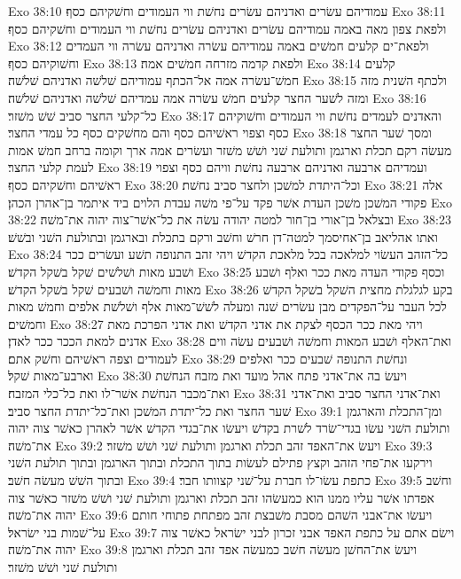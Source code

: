 Exo 38:10  עמודיהם עשׂרים ואדניהם עשׂרים נחשׁת ווי העמודים וחשׁקיהם כסף׃
Exo 38:11  ולפאת צפון מאה באמה עמודיהם עשׂרים ואדניהם עשׂרים נחשׁת ווי העמודים וחשׁקיהם כסף׃
Exo 38:12  ולפאת־ים קלעים חמשׁים באמה עמודיהם עשׂרה ואדניהם עשׂרה ווי העמדים וחשׁוקיהם כסף׃
Exo 38:13  ולפאת קדמה מזרחה חמשׁים אמה׃
Exo 38:14  קלעים חמשׁ־עשׂרה אמה אל־הכתף עמודיהם שׁלשׁה ואדניהם שׁלשׁה׃
Exo 38:15  ולכתף השׁנית מזה ומזה לשׁער החצר קלעים חמשׁ עשׂרה אמה עמדיהם שׁלשׁה ואדניהם שׁלשׁה׃
Exo 38:16  כל־קלעי החצר סביב שׁשׁ משׁזר׃
Exo 38:17  והאדנים לעמדים נחשׁת ווי העמודים וחשׁוקיהם כסף וצפוי ראשׁיהם כסף והם מחשׁקים כסף כל עמדי החצר׃
Exo 38:18  ומסך שׁער החצר מעשׂה רקם תכלת וארגמן ותולעת שׁני ושׁשׁ משׁזר ועשׂרים אמה ארך וקומה ברחב חמשׁ אמות לעמת קלעי החצר׃
Exo 38:19  ועמדיהם ארבעה ואדניהם ארבעה נחשׁת וויהם כסף וצפוי ראשׁיהם וחשׁקיהם כסף׃
Exo 38:20  וכל־היתדת למשׁכן ולחצר סביב נחשׁת׃
Exo 38:21  אלה פקודי המשׁכן משׁכן העדת אשׁר פקד על־פי משׁה עבדת הלוים ביד איתמר בן־אהרן הכהן׃
Exo 38:22  ובצלאל בן־אורי בן־חור למטה יהודה עשׂה את כל־אשׁר־צוה יהוה את־משׁה׃
Exo 38:23  ואתו אהליאב בן־אחיסמך למטה־דן חרשׁ וחשׁב ורקם בתכלת ובארגמן ובתולעת השׁני ובשׁשׁ׃
Exo 38:24  כל־הזהב העשׂוי למלאכה בכל מלאכת הקדשׁ ויהי זהב התנופה תשׁע ועשׂרים ככר ושׁבע מאות ושׁלשׁים שׁקל בשׁקל הקדשׁ׃
Exo 38:25  וכסף פקודי העדה מאת ככר ואלף ושׁבע מאות וחמשׁה ושׁבעים שׁקל בשׁקל הקדשׁ׃
Exo 38:26  בקע לגלגלת מחצית השׁקל בשׁקל הקדשׁ לכל העבר על־הפקדים מבן עשׂרים שׁנה ומעלה לשׁשׁ־מאות אלף ושׁלשׁת אלפים וחמשׁ מאות וחמשׁים׃
Exo 38:27  ויהי מאת ככר הכסף לצקת את אדני הקדשׁ ואת אדני הפרכת מאת אדנים למאת הככר ככר לאדן׃
Exo 38:28  ואת־האלף ושׁבע המאות וחמשׁה ושׁבעים עשׂה ווים לעמודים וצפה ראשׁיהם וחשׁק אתם׃
Exo 38:29  ונחשׁת התנופה שׁבעים ככר ואלפים וארבע־מאות שׁקל׃
Exo 38:30  ויעשׂ בה את־אדני פתח אהל מועד ואת מזבח הנחשׁת ואת־מכבר הנחשׁת אשׁר־לו ואת כל־כלי המזבח׃
Exo 38:31  ואת־אדני החצר סביב ואת־אדני שׁער החצר ואת כל־יתדת המשׁכן ואת־כל־יתדת החצר סביב׃
Exo 39:1  ומן־התכלת והארגמן ותולעת השׁני עשׂו בגדי־שׂרד לשׁרת בקדשׁ ויעשׂו את־בגדי הקדשׁ אשׁר לאהרן כאשׁר צוה יהוה את־משׁה׃
Exo 39:2  ויעשׂ את־האפד זהב תכלת וארגמן ותולעת שׁני ושׁשׁ משׁזר׃
Exo 39:3  וירקעו את־פחי הזהב וקצץ פתילם לעשׂות בתוך התכלת ובתוך הארגמן ובתוך תולעת השׁני ובתוך השׁשׁ מעשׂה חשׁב׃
Exo 39:4  כתפת עשׂו־לו חברת על־שׁני קצוותו חבר׃
Exo 39:5  וחשׁב אפדתו אשׁר עליו ממנו הוא כמעשׂהו זהב תכלת וארגמן ותולעת שׁני ושׁשׁ משׁזר כאשׁר צוה יהוה את־משׁה׃
Exo 39:6  ויעשׂו את־אבני השׁהם מסבת משׁבצת זהב מפתחת פתוחי חותם על־שׁמות בני ישׂראל׃
Exo 39:7  וישׂם אתם על כתפת האפד אבני זכרון לבני ישׂראל כאשׁר צוה יהוה את־משׁה׃
Exo 39:8  ויעשׂ את־החשׁן מעשׂה חשׁב כמעשׂה אפד זהב תכלת וארגמן ותולעת שׁני ושׁשׁ משׁזר׃
